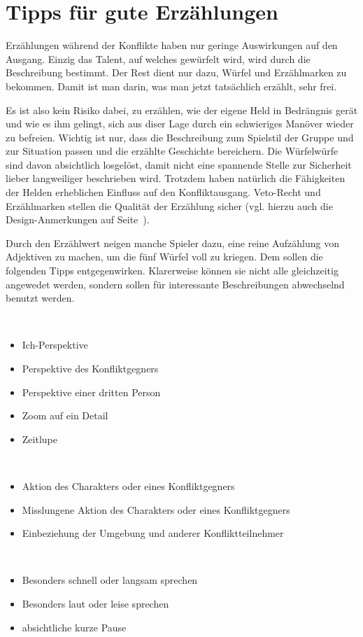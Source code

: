 \section{Tipps für gute Erzählungen}\label{TippsGuteErz}
Erzählungen während der Konflikte haben nur geringe Auswirkungen auf den Ausgang. Einzig das Talent, auf welches gewürfelt wird, wird durch die Beschreibung bestimmt. Der Rest dient nur dazu, Würfel und Erzählmarken zu bekommen. Damit ist man darin, was man jetzt tatsächlich erzählt, sehr frei.

Es ist also kein Risiko dabei, zu erzählen, wie der eigene Held in Bedrängnis gerät und wie es ihm gelingt, sich aus diser Lage durch ein schwieriges Manöver wieder zu befreien. Wichtig ist nur, dass die Beschreibung zum Spielstil der Gruppe und zur Situation passen und die erzählte Geschichte bereichern. Die Würfelwürfe sind davon absichtlich losgelöst, damit nicht eine spannende Stelle zur Sicherheit lieber langweiliger beschrieben wird. Trotzdem haben natürlich die Fähigkeiten der Helden erheblichen Einfluss auf den Konfliktausgang. Veto-Recht und Erzählmarken stellen die Qualität der Erzählung sicher (vgl. hierzu auch die Design-Anmerkungen auf Seite~\pageref{DesignAnmerkungenZusammenspielErzaehlregeln}).

Durch den Erzählwert neigen manche Spieler dazu, eine reine Aufzählung von Adjektiven zu machen, um die fünf Würfel voll zu kriegen. Dem sollen die folgenden Tipps entgegenwirken. Klarerweise können sie nicht alle gleichzeitig angewedet werden, sondern sollen für interessante Beschreibungen abwechselnd benutzt werden.

\begin{description}
  \pagebreak[3]
  \item[Perspektiven:]~
  \begin{itemize}
    \item Ich-Perspektive
    \item Perspektive des Konfliktgegners
    \item Perspektive einer dritten Person
    \item Zoom auf ein Detail
    \item Zeitlupe
  \end{itemize}
  \pagebreak[3]
  \item[Inhalte:]~
  \begin{itemize}
    \item Aktion des Charakters oder eines Konfliktgegners
    \item Misslungene Aktion des Charakters oder eines Konfliktgegners 
    \item Einbeziehung der Umgebung und anderer Konfliktteilnehmer
  \end{itemize}
  \pagebreak[3]
  \item[Art und Weise:]~
  \begin{itemize}
    \item Besonders schnell oder langsam sprechen
    \item Besonders laut oder leise sprechen
    \item absichtliche kurze Pause
  \end{itemize}
\end{description}

